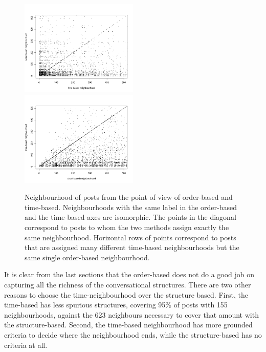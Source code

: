 \documentclass[conference]{IEEEtran}
\begin{document}
\begin{figure}
\centering
\includegraphics[width=0.5\textwidth]{confusion_time_order}%
\includegraphics[width=0.5\textwidth]{confusion_struct_time}
\caption{Neighbourhood of posts from the point of view of order-based and time-based. Neighbourhoods with the same label in the order-based and the time-based axes are isomorphic. The points in the diagonal correspond to posts to whom the two methods assign exactly the same neighbourhood. Horizontal rows of points correspond to posts that are assigned many different time-based neighbourhoods but the same single order-based neighbourhood.}
\label{fig:confusion}
\end{figure}



It is clear from the last sections that the order-based does not do a good job on capturing all the richness of the conversational structures. There are two other reasons to choose the time-neighbourhood over the structure based. First, the time-based has less spurious structures, covering 95\% of posts with 155 neighbourhoods, against the 623 neighbours necessary to cover that amount with the structure-based. Second, the time-based neighbourhood has more grounded criteria to decide where the neighbourhood ends, while the structure-based has no criteria at all.
\end{document}
